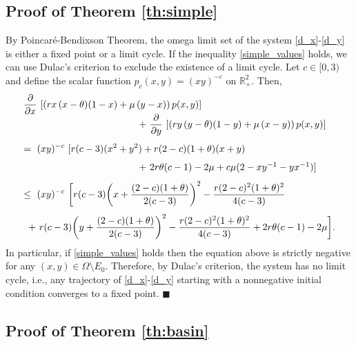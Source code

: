 \subsection*{Proof of Theorem \ref{th:simple}}

\indent By Poincar\'e-Bendixson Theorem, the omega limit set of the system \eqref{d_x}-\eqref{d_y} is either a fixed point or a limit cycle.
 If the inequality \eqref{simple_values} holds, we can use Dulac's criterion to exclude the existence of a limit cycle.
 Let $c \in [0, 3)$ and define the scalar function $p_c (x, y) = (xy)^{-c}$ on ${{\mathbb{R}}}^2_+$. Then,
 $$ \begin{array}{l}
    \displaystyle \frac{\partial}{\partial x} \ [(r x \,(x - \theta) (1 - x) + \mu \,(y - x)) \,p(x, y)] \\ \hspace{120pt} + \
    \displaystyle \frac{\partial}{\partial y} \ [(r y \,(y - \theta) (1 - y) + \mu \,(x - y)) \,p(x, y)] \vspace{8pt} \\ = \
    \displaystyle (xy)^{-c} \ [r (c - 3) (x^2 + y^2) + r (2 - c) (1 + \theta) (x + y) \\ \vspace{-5pt} \\ \hspace{120pt} + \
     2 r \theta (c - 1) - 2 \mu + c \mu (2 - x y^{-1} - y x^{-1})] \vspace{8pt} \\ \leq \
    \displaystyle (xy)^{-c} \ \bigg[r (c - 3) \bigg(x + \frac{(2 - c)(1 + \theta)}{2 (c - 3)} \bigg)^2 - \frac{r (2 - c)^2 (1 + \theta)^2}{4 (c - 3)} \vspace{8pt} \\ \hspace{5pt} + \
    \displaystyle                   r (c - 3) \bigg(y + \frac{(2 - c)(1 + \theta)}{2 (c - 3)} \bigg)^2 - \frac{r (2 - c)^2 (1 + \theta)^2}{4 (c - 3)}
    \displaystyle + 2 r \theta (c - 1) - 2 \mu \bigg]. \end{array}$$
 In particular, if \eqref{simple_values} holds then the equation above is strictly negative for any $(x, y) \in \Omega \setminus E_0$.
 Therefore, by Dulac's criterion, the system has no limit cycle, i.e., any trajectory of \eqref{d_x}-\eqref{d_y} starting with
 a nonnegative initial condition converges to a fixed point. \hspace{2mm} $\blacksquare$

\subsection*{Proof of Theorem \ref{th:basin}}

